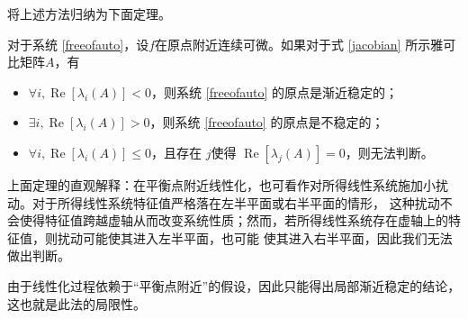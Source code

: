   将上述方法归纳为下面定理。
  \begin{theorem}[通过线性化判别非线性系统稳定性]
    对于系统 \eqref{freeofauto}，设$f$在原点附近连续可微。如果对于式 \eqref{jacobian} 所示雅可比矩阵$A$，有
    \begin{itemize}[leftmargin=1em]
    \item $\forall i, \ensuremath{\operatorname{Re}} [\lambda_i (A)] < 0$，则系统 \eqref{freeofauto} 的原点是渐近稳定的；
    \item $\exists i, \ensuremath{\operatorname{Re}} [\lambda_i (A)] > 0$，则系统 \eqref{freeofauto} 的原点是不稳定的；
    \item $\forall i, \ensuremath{\operatorname{Re}} [\lambda_i (A)] \le 0$，且存在
    $j$使得 $\ensuremath{\operatorname{Re}} [\lambda_j (A)] = 0$，则无法判断。
    \end{itemize}
  \end{theorem}
  \begin{note}
    上面定理的直观解释：在平衡点附近线性化，也可看作对所得线性系统施加小扰动。对于所得线性系统特征值严格落在左半平面或右半平面的情形，
    这种扰动不会使得特征值跨越虚轴从而改变系统性质；然而，若所得线性系统存在虚轴上的特征值，则扰动可能使其进入左半平面，也可能
    使其进入右半平面，因此我们无法做出判断。

    由于线性化过程依赖于“平衡点附近”的假设，因此只能得出局部渐近稳定的结论，这也就是此法的局限性。
  \end{note}
  \newpage
